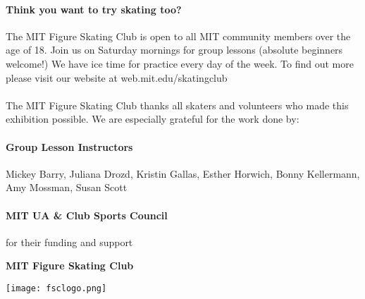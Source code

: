 \documentclass[12pt]{article}
\newcommand{\programnumber}[3]{{
  \vspace{0.2in}
  \textbf{#1}\\
  {\footnotesize #2 \textit{#3}}
}}
\begin{document}
\begin{multicols*}{2}


\paragraph{Think you want to try skating too?} The MIT Figure Skating Club is open to all MIT community members over the age of 18. Join us on Saturday mornings for group lessons (absolute beginners welcome!) We have ice time for practice every day of the week. To find out more please visit our website at web.mit.edu/skatingclub

\paragraph{} The MIT Figure Skating Club thanks all skaters and volunteers who made this exhibition possible. We are especially grateful for the work done by:

\paragraph{Group Lesson Instructors} Mickey Barry, Juliana Drozd, Kristin Gallas, Esther Horwich, Bonny Kellermann, Amy Mossman, Susan Scott
\paragraph{MIT UA \& Club Sports Council} for their funding and support

\vfill\null
\columnbreak


\begin{center}

\vspace*{1.5in}

\begin{Large}
{\bfseries
MIT Figure Skating Club
}
\end{Large}

\vspace{0.2in}

\begin{large}
{\bfseries
}
\end{large}

\vspace{0.7in}

\texttt{[image: fsclogo.png]}

\end{center}

\vfill\null
\columnbreak



\begin{center}



\end{center}
\end{multicols*}
\end{document}

